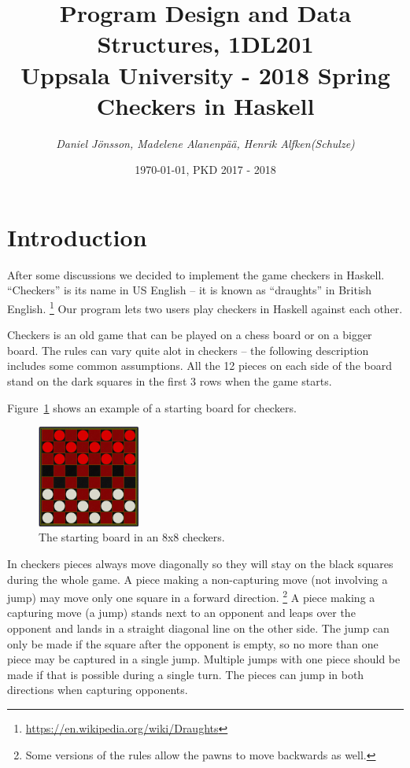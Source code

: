 \documentclass[12pt,a4paper]{article}
\title{Program Design and Data Structures, 1DL201 \\
	Uppsala University - 2018 Spring \\
	\textbf{Checkers in Haskell}}
\author{\textit{Daniel Jönsson, Madelene Alanenpää, Henrik Alfken(Schulze)}}
\date{\today, PKD 2017 - 2018}
\begin{document}
\maketitle
\newpage
\tableofcontents
\newpage

\section{Introduction}
After some discussions we decided to implement the game checkers in Haskell. 
``Checkers'' is its  name in US English -- it is known as ``draughts'' in British 
English.
\footnote{\href{https://en.wikipedia.org/wiki/Draughts}
	{https://en.wikipedia.org/wiki/Draughts}}
Our program lets two users play checkers in Haskell against each other. 

Checkers is an old game that can be played on a chess board or on a bigger board. The 
rules can vary quite alot in checkers -- the following description includes some common 
assumptions. All the 12 pieces on each side of the board stand on the dark squares in 
the first 3 rows when the game starts. 

Figure~\ref{fig1} shows an example of a starting board for checkers.
\begin{figure}[htp]
\centering
\includegraphics[width= 0.3\textwidth]{Startboarexample.PNG}
\caption{The starting board in an 8x8 checkers.}
\label{fig1}
\end{figure}

In checkers pieces always move diagonally so they will stay on the black squares during 
the whole game. A piece making a non-capturing move (not involving a jump) may move only 
one square in a forward direction.
\footnote{Some versions of the rules allow the pawns to move backwards as well.}
A piece making a capturing move (a jump) stands next to an opponent and leaps over the 
opponent and lands in a straight diagonal line on the other side. The jump can only be 
made if the square after the opponent is empty, so no more than one piece may be 
captured in a single jump. Multiple jumps with one piece should be made if that is 
possible during a single turn. The pieces can jump in both directions when capturing 
opponents.
\end{document}
